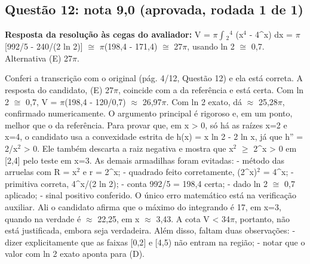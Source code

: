 \documentclass{article}%
\begin{document}
\subsection*{Questão 12: nota 9,0 (aprovada, rodada 1 de 1)}%
\textbf{Resposta da resolução às cegas do avaliador:} V = $\pi$$\int$$_{2}$$^{4}$ (x$^{4}$ - 4\^{}x) dx = $\pi${[}992/5 - 240/(2 ln 2){]} $\cong$ $\pi$(198,4 - 171,4) $\cong$ 27$\pi$, usando ln 2 $\cong$ 0,7. Alternativa (E) 27$\pi$.\par %
Conferi a transcrição com o original (pág. 4/12, Questão 12) e ela está correta. A resposta do candidato, (E) 27$\pi$, coincide com a da referência e está certa. Com ln 2 $\cong$ 0,7, V = $\pi$(198,4 - 120/0,7) $\approx$ 26,97$\pi$. Com ln 2 exato, dá $\approx$ 25,28$\pi$, confirmado numericamente.\newline%
\newline%
O argumento principal é rigoroso e, em um ponto, melhor que o da referência. Para provar que, em x > 0, só há as raízes x=2 e x=4, o candidato usa a convexidade estrita de h(x) = x ln 2 - 2 ln x, já que h'' = 2/x$^2$ > 0. Ele também descarta a raiz negativa e mostra que x$^2$ $\geq$ 2\^{}x > 0 em {[}2,4{]} pelo teste em x=3.\newline%
\newline%
As demais armadilhas foram evitadas:\newline%
{-} método das arruelas com R = x$^2$ e r = 2\^{}x;\newline%
{-} quadrado feito corretamente, (2\^{}x)$^2$ = 4\^{}x;\newline%
{-} primitiva correta, 4\^{}x/(2 ln 2);\newline%
{-} conta 992/5 = 198,4 certa;\newline%
{-} dado ln 2 $\cong$ 0,7 aplicado;\newline%
{-} sinal positivo conferido.\newline%
\newline%
O único erro matemático está na verificação auxiliar. Ali o candidato afirma que o máximo do integrando é 17, em x=3, quando na verdade é $\approx$ 22,25, em x $\approx$ 3,43. A cota V < 34$\pi$, portanto, não está justificada, embora seja verdadeira. Além disso, faltam duas observações:\newline%
{-} dizer explicitamente que as faixas {[}0,2{]} e {[}4,5) não entram na região;\newline%
{-} notar que o valor com ln 2 exato aponta para (D).\newline%
\newline%
$$
\end{document}
